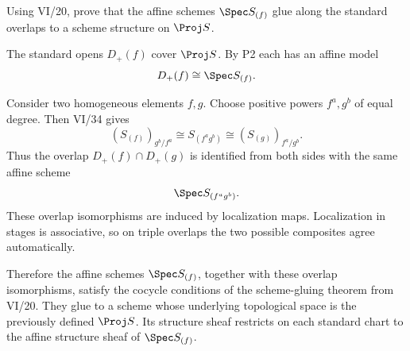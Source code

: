 \begin{problem}\label{prob:vi35-03}
Using VI/20, prove that the affine schemes \(\Spec S_{(f)}\) glue along the standard overlaps to a scheme structure on \(\Proj S\).
\end{problem}

\ifdefined\FullProblemDossiers
\begin{solution}
The standard opens \(D_+(f)\) cover \(\Proj S\). By P2 each has an affine model
\[
D_+(f)\cong\Spec S_{(f)}.
\]

Consider two homogeneous elements \(f,g\). Choose positive powers \(f^a,g^b\) of equal degree. Then VI/34 gives
\[
(S_{(f)})_{g^b/f^a}
\cong
S_{(f^ag^b)}
\cong
(S_{(g)})_{f^a/g^b}.
\]
Thus the overlap \(D_+(f)\cap D_+(g)\) is identified from both sides with the same affine scheme
\[
\Spec S_{(f^ag^b)}.
\]
These overlap isomorphisms are induced by localization maps. Localization in stages is associative, so on triple
overlaps the two possible composites agree automatically.

Therefore the affine schemes \(\Spec S_{(f)}\), together with these overlap isomorphisms, satisfy the cocycle
conditions of the scheme-gluing theorem from VI/20. They glue to a scheme whose underlying topological space is
the previously defined \(\Proj S\). Its structure sheaf restricts on each standard chart to the affine structure
sheaf of \(\Spec S_{(f)}\).
\end{solution}
\fi

